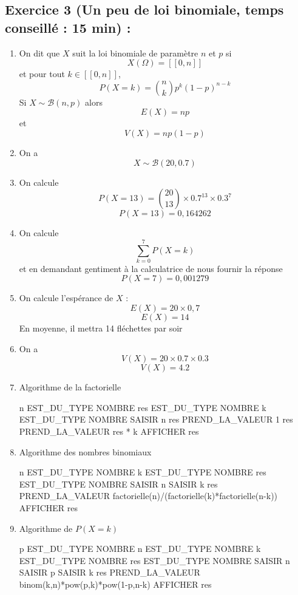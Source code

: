 \subsection*{Exercice 3 (Un peu de loi binomiale, temps conseillé : 15 min) : }
\begin{enumerate}
\item On dit que $X$ suit la loi binomiale de paramètre $n$ et $p$ si $$X(\Omega) = [\![0,n]\!]$$ et pour tout $k \in [\![0,n]\!]$, $$P(X = k) = \binom{n}{k} p^k(1-p)^{n-k}$$ Si $X \sim \mathscr{B}(n,p)$ alors $$E(X) = np$$ et $$V(X) = np(1-p)$$ 
\item On a $$\boxed{X\sim \mathscr{B}(20,0.7)}$$
\item On calcule $$P(X = 13) = \binom{20}{13}\times0.7^{13}\times0.3^7$$
$$\boxed{P(X=13) = 0,164262}$$
\item On calcule 
$$\sum_{k=0}^7 P(X=k)$$ et en demandant gentiment à la calculatrice de nous fournir la réponse 
$$\boxed{P(X=7) = 0,001279}$$
\item On calcule l'espérance de $X$ : $$E(X) = 20 \times 0,7$$
$$\boxed{E(X) = 14}$$
En moyenne, il mettra 14 fléchettes par soir
\item On a 
$$V(X) = 20\times 0.7 \times 0.3$$
$$\boxed{V(X) = 4.2}$$
\item Algorithme de la factorielle
\begin{algobox}
\Variables
\Ligne n EST\_DU\_TYPE NOMBRE
\Ligne res EST\_DU\_TYPE NOMBRE
\Ligne k EST\_DU\_TYPE NOMBRE
\DebutAlgo
\Ligne SAISIR n
\Ligne res PREND\_LA\_VALEUR 1
\DebutPour
\Ligne res PREND\_LA\_VALEUR res * k
\FinPour
\Ligne AFFICHER res
\FinAlgo

\end{algobox}
\item Algorithme des nombres binomiaux
\begin{algobox}
\Variables
\Ligne n EST\_DU\_TYPE NOMBRE
\Ligne k EST\_DU\_TYPE NOMBRE
\Ligne res EST\_DU\_TYPE NOMBRE
\DebutAlgo
\Ligne SAISIR n
\Ligne SAISIR k
\Ligne res PREND\_LA\_VALEUR factorielle(n)/(factorielle(k)*factorielle(n-k))
\Ligne AFFICHER res
\FinAlgo

\end{algobox}
\item Algorithme de $P(X=k)$
\begin{algobox}
\Variables
\Ligne p EST\_DU\_TYPE NOMBRE
\Ligne n EST\_DU\_TYPE NOMBRE
\Ligne k EST\_DU\_TYPE NOMBRE
\Ligne res EST\_DU\_TYPE NOMBRE
\DebutAlgo
\Ligne SAISIR n
\Ligne SAISIR p
\Ligne SAISIR k
\Ligne res PREND\_LA\_VALEUR binom(k,n)*pow(p,k)*pow(1-p,n-k)
\Ligne AFFICHER res
\FinAlgo
\end{algobox}
\end{enumerate}

